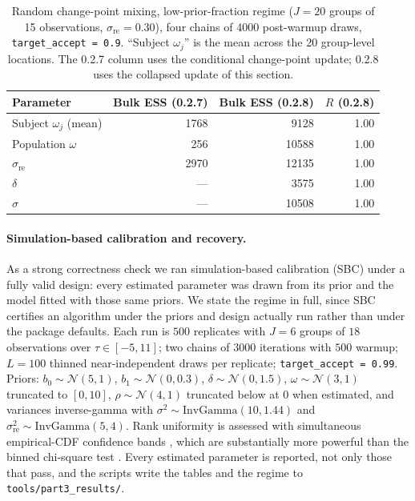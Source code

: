 \documentclass[12pt]{article}
\newcommand{\code}[1]{\texttt{#1}}
\begin{document}
\begin{table}[t]
\centering
\caption{Random change-point mixing, low-prior-fraction regime ($J = 20$ groups of 15 observations, $\sigma_{\mathrm{re}} = 0.30$), four chains of 4000 post-warmup draws, \code{target\_accept = 0.9}. ``Subject $\omega_j$'' is the mean across the 20 group-level locations. The 0.2.7 column uses the conditional change-point update; 0.2.8 uses the collapsed update of this section.}
\label{tab:mixing}
\begin{tabular}{lrrr}
\toprule
Parameter & Bulk ESS (0.2.7) & Bulk ESS (0.2.8) & $\widehat{R}$ (0.2.8) \\
\midrule
Subject $\omega_j$ (mean) & 1768 &  9128 & 1.00 \\
Population $\omega$       &  256 & 10588 & 1.00 \\
$\sigma_{\mathrm{re}}$    & 2970 & 12135 & 1.00 \\
$\delta$                  & ---  &  3575 & 1.00 \\
$\sigma$                  & ---  & 10508 & 1.00 \\
\bottomrule
\end{tabular}
\end{table}

\paragraph{Simulation-based calibration and recovery.}
As a strong correctness check we ran simulation-based calibration (SBC) under a fully valid design: every estimated parameter was drawn from its prior and the model fitted with those same priors. We state the regime in full, since SBC certifies an algorithm under the priors and design actually run rather than under the package defaults. Each run is $500$ replicates with $J = 6$ groups of $18$ observations over $\tau \in [-5, 11]$; two chains of $3000$ iterations with $500$ warmup; $L = 100$ thinned near-independent draws per replicate; \code{target\_accept = 0.99}. Priors: $b_0 \sim \mathcal{N}(5, 1)$, $b_1 \sim \mathcal{N}(0, 0.3)$, $\delta \sim \mathcal{N}(0, 1.5)$, $\omega \sim \mathcal{N}(3, 1)$ truncated to $[0, 10]$, $\rho \sim \mathcal{N}(4, 1)$ truncated below at $0$ when estimated, and variances inverse-gamma with $\sigma^2 \sim \mathrm{InvGamma}(10, 1.44)$ and $\sigma_{\mathrm{re}}^2 \sim \mathrm{InvGamma}(5, 4)$. Rank uniformity is assessed with simultaneous empirical-CDF confidence bands \citep{sailynoja2022}, which are substantially more powerful than the binned chi-square test \citep{talts2018}. Every estimated parameter is reported, not only those that pass, and the scripts write the tables and the regime to \code{tools/part3\_results/}.
\end{document}
